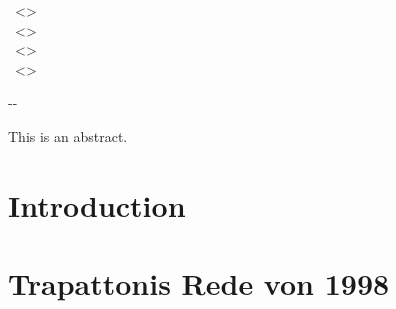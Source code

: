 \documentclass[12pt,        %
  english,ngerman,          %
  paper=a4,                 %
  captions=tablesignature,  %
  listof=numbered,          %
  bibliography=totoc,       %
  headings=small,           %
  headinclude=false,        %
  footinclude=false,        %
  parskip=half-,            %
  oneside,                  %
  DIV=12                    %
]{styles/colireport}
\begin{document}
\vspace{1cm}

\small
\coliauthorone~<\colimailone>	\\
\coliauthortwo~<\colimailtwo>	\\
\coliauthorthree~<\colimailthree>	\\
\coliauthorfour~<\colimailfour>	\\
\coliinstitute

\vspace{0.5cm}

\the\year-\the\month-\the\day~\colilicence	\\
\colidoi

\vspace{1cm}

\begin{minipage}{\textwidth}\bf
	
	This is an abstract.
\end{minipage}

\newpage


\section*{Introduction}

\lipsum


\section*{Trapattonis Rede von 1998}
\end{document}
